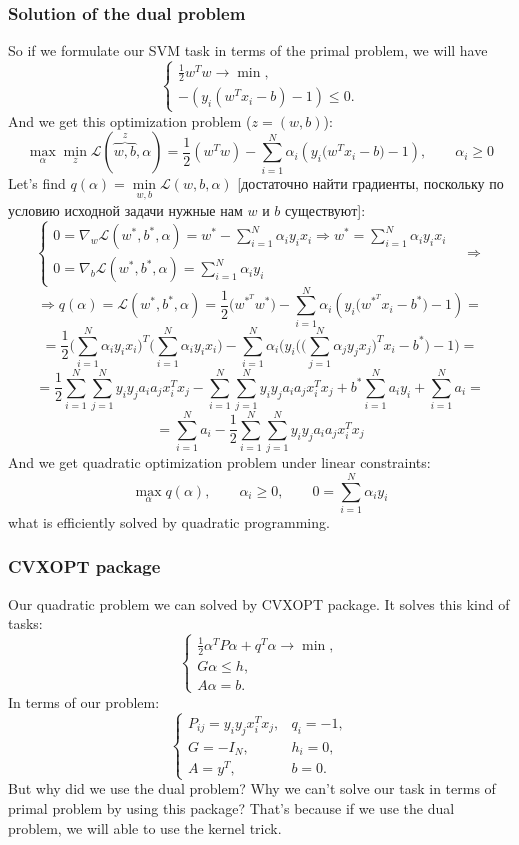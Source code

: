 \subsubsection*{Solution of the dual problem}

So if we formulate our SVM task in terms of the primal problem, we will have
$$\begin{cases}
	\frac{1}{2}w^Tw\to\min, \\
	-(y_i(w^Tx_i-b)-1)\le0.
\end{cases}$$
And we get this optimization problem ($z=(w,b)$):
$$\max\limits_{\alpha}\min\limits_{z}\mathcal{L}(\overbrace{w,b}^z,\alpha)=\frac{1}{2}(w^Tw)-\sum\limits_{i=1}^{N}\alpha_i(y_i\big(w^Tx_i-b\big)-1),\qquad\alpha_i\ge0$$
Let's find $q(\alpha)=\min\limits_{w,b}\mathcal{L}(w,b,\alpha)$ [достаточно найти градиенты, поскольку по условию исходной задачи нужные нам $w$ и $b$ существуют]:
$$\begin{cases}
	0=\nabla_w\mathcal{L}(w^*,b^*,\alpha)=w^*-\sum\limits_{i=1}^{N}\alpha_iy_ix_i\Rightarrow w^*=\sum\limits_{i=1}^{N}\alpha_iy_ix_i &  \\
	0=\nabla_b\mathcal{L}(w^*,b^*,\alpha)=\sum\limits_{i=1}^{N}\alpha_iy_i & 
\end{cases}\Longrightarrow$$
$$\Longrightarrow q(\alpha)=\mathcal{L}(w^*,b^*,\alpha)=\frac{1}{2}\big(w^{*^T}w^*\big)-\sum\limits_{i=1}^{N}\alpha_i(y_i\big(w^{*^T}x_i-b^*\big)-1)=$$
$$=\frac{1}{2}\Big(\sum\limits_{i=1}^{N}\alpha_iy_ix_i\Big)^T\Big(\sum\limits_{i=1}^{N}\alpha_iy_ix_i\Big)-\sum\limits_{i=1}^{N}\alpha_i\big(y_i\Big(\Big(\sum\limits_{j=1}^{N}\alpha_jy_jx_j\Big)^Tx_i-b^*\Big)-1\big)=$$
$$=\frac{1}{2}\sum\limits_{i=1}^{N}\sum\limits_{j=1}^{N}y_iy_ja_ia_jx_i^Tx_j-\sum\limits_{i=1}^{N}\sum\limits_{j=1}^{N}y_iy_ja_ia_jx_i^Tx_j+b^*\sum\limits_{i=1}^{N}a_iy_i+\sum\limits_{i=1}^{N}a_i=$$
$$=\sum\limits_{i=1}^{N}a_i-\frac{1}{2}\sum\limits_{i=1}^{N}\sum\limits_{j=1}^{N}y_iy_ja_ia_jx_i^Tx_j$$
And we get quadratic optimization problem under linear constraints:
$$\max\limits_{\alpha}q(\alpha),\qquad\alpha_i\ge0,\qquad 0=\sum\limits_{i=1}^{N}\alpha_iy_i$$
what is efficiently solved by quadratic programming.

\subsubsection*{CVXOPT package}

Our quadratic problem we can solved by CVXOPT package. It solves this kind of tasks:
$$\begin{cases}
	\frac{1}{2}\alpha^TP\alpha+q^T\alpha\to\min,\\
	G\alpha\le h, \\
	A\alpha=b.
\end{cases}$$
In terms of our problem:
$$\begin{cases}
	P_{ij}=y_iy_jx_i^Tx_j, & q_i=-1, \\
	G=-I_N, & h_i = 0, \\
	A=y^T, & b = 0.
\end{cases}$$
But why did we use the dual problem? Why we can't solve our task in terms of primal problem by using this package? That's because if we use the dual problem, we will able to use the kernel trick.

